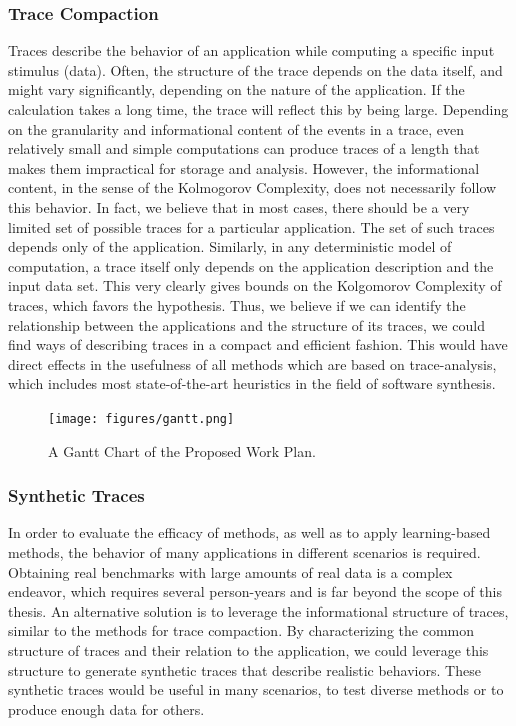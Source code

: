 \documentclass[sigplan,10pt]{acmart}
\begin{document}
\subsubsection{Trace Compaction}
Traces describe the behavior of an application while computing a specific input stimulus (data). Often, the structure of the trace depends on the data itself, and might vary significantly, depending on the nature of the application.
If the calculation takes a long time, the trace will reflect this by being large.
Depending on the granularity and informational content of the events in a trace, even relatively small and simple computations can produce traces of a length that makes them impractical for storage and analysis.
However, the informational content, in the sense of the Kolmogorov Complexity, does not necessarily follow this behavior.
In fact, we believe that in most cases, there should be a very limited set of possible traces for a particular application. The set of such traces depends only of the application.
Similarly, in any deterministic model of computation, a trace itself only depends on the application description and the input data set. This very clearly gives bounds on the Kolgomorov Complexity of traces, which favors the hypothesis.
Thus, we believe if we can identify the relationship between the applications and the structure of its traces, we could find ways of describing traces in a compact and efficient fashion. 
This would have direct effects in the usefulness of all methods which are based on trace-analysis, which includes most state-of-the-art heuristics in the field of software synthesis.


 \begin{figure}
 	\centering
 	\texttt{[image: figures/gantt.png]} 
 	\caption{A Gantt Chart of the Proposed Work Plan.}
 	\label{fig:gantt}
 		\vspace{-3mm}
 \end{figure}

\subsubsection{Synthetic Traces}
In order to evaluate the efficacy of methods, as well as to apply learning-based methods, the behavior of many applications in different scenarios is required. 
Obtaining real benchmarks with large amounts of real data is a complex endeavor, which requires several person-years and is far beyond the scope of this thesis. 
An alternative solution is to leverage the informational structure of traces, similar to the methods for trace compaction.
By characterizing the common structure of traces and their relation to the application, we could leverage this structure to generate synthetic traces that describe realistic behaviors.
These synthetic traces would be useful in many scenarios, to test diverse methods or to produce enough data for others.
\end{document}
